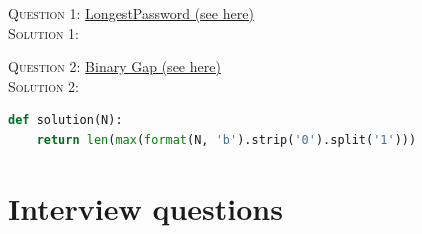 \documentclass[11pt]{article}
\begin{document}
\textsc{Question 1:} \href{https://app.codility.com/programmers/trainings/1/longest_password/}{LongestPassword (see here)} \\
\textsc{Solution 1:} 


\begin{mdframed}[backgroundcolor=celadon!6]

\end{mdframed}

\textsc{Question 2:} \href{https://app.codility.com/programmers/lessons/1-iterations/binary_gap/}{Binary Gap (see here)} \\
\textsc{Solution 2:} 

\begin{mdframed}[backgroundcolor=celadon!6]
\begin{lstlisting}[language=Python]
def solution(N):
    return len(max(format(N, 'b').strip('0').split('1'))) 
\end{lstlisting}
   \end{mdframed} 
   
   
   
   


\section{Interview questions}
\end{document}
